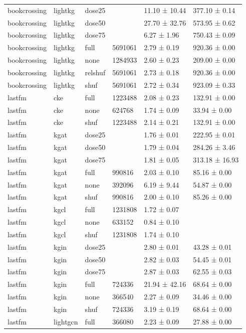 \begin{table}[t]
\begin{tabular}{llllll}
bookcrossing & lightkg & dose25 &  & 11.10 ± 10.44 & 377.10 ± 0.14 \\
bookcrossing & lightkg & dose50 &  & 27.70 ± 32.76 & 573.95 ± 0.62 \\
bookcrossing & lightkg & dose75 &  & 6.27 ± 1.96 & 750.43 ± 0.09 \\
bookcrossing & lightkg & full & 5691061 & 2.79 ± 0.19 & 920.36 ± 0.00 \\
bookcrossing & lightkg & none & 1284933 & 2.60 ± 0.23 & 209.00 ± 0.00 \\
bookcrossing & lightkg & relshuf & 5691061 & 2.73 ± 0.18 & 920.36 ± 0.00 \\
bookcrossing & lightkg & shuf & 5691061 & 2.72 ± 0.34 & 923.09 ± 0.33 \\
lastfm & cke & full & 1223488 & 2.08 ± 0.23 & 132.91 ± 0.00 \\
lastfm & cke & none & 624768 & 1.74 ± 0.09 & 33.94 ± 0.00 \\
lastfm & cke & shuf & 1223488 & 2.14 ± 0.21 & 132.91 ± 0.00 \\
lastfm & kgat & dose25 &  & 1.76 ± 0.01 & 222.95 ± 0.01 \\
lastfm & kgat & dose50 &  & 1.79 ± 0.04 & 284.26 ± 3.46 \\
lastfm & kgat & dose75 &  & 1.81 ± 0.05 & 313.18 ± 16.93 \\
lastfm & kgat & full & 990816 & 2.03 ± 0.10 & 85.16 ± 0.00 \\
lastfm & kgat & none & 392096 & 6.19 ± 9.44 & 54.87 ± 0.00 \\
lastfm & kgat & shuf & 990816 & 2.00 ± 0.10 & 85.26 ± 0.00 \\
lastfm & kgcl & full & 1231808 & 1.72 ± 0.07 &  \\
lastfm & kgcl & none & 633152 & 0.84 ± 0.10 &  \\
lastfm & kgcl & shuf & 1231808 & 1.74 ± 0.10 &  \\
lastfm & kgin & dose25 &  & 2.80 ± 0.01 & 43.28 ± 0.01 \\
lastfm & kgin & dose50 &  & 2.82 ± 0.03 & 54.45 ± 0.01 \\
lastfm & kgin & dose75 &  & 2.87 ± 0.03 & 62.55 ± 0.03 \\
lastfm & kgin & full & 724336 & 21.94 ± 42.16 & 68.64 ± 0.00 \\
lastfm & kgin & none & 366540 & 2.27 ± 0.09 & 34.46 ± 0.00 \\
lastfm & kgin & shuf & 724336 & 3.19 ± 0.19 & 68.64 ± 0.00 \\
lastfm & lightgcn & full & 366080 & 2.23 ± 0.09 & 27.88 ± 0.00 \\

\end{tabular}
\end{table}

